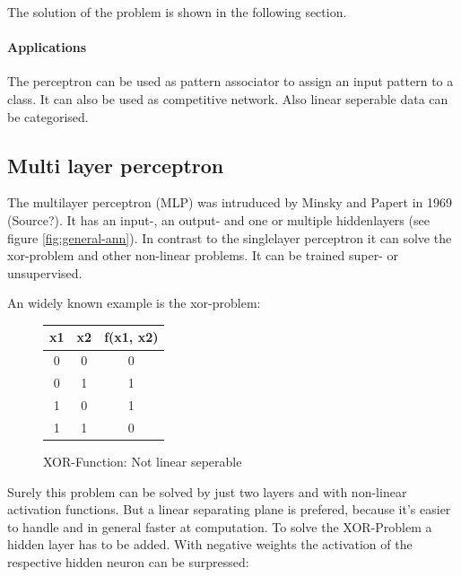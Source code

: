 \documentclass[10pt,a4paper,DIV=11]{scrreprt}
\begin{document}
The solution of the problem is shown in the following section.

\paragraph*{Applications}
The perceptron can be used as pattern associator to assign an input pattern to a class. It can also be used as competitive network. Also linear seperable data can be categorised.

\subsection{Multi layer perceptron} \label{sec:mlp}
The multilayer perceptron (MLP) was intruduced by Minsky and Papert in 1969 (Source?). It has an input-, an output- and
one or multiple hiddenlayers (see figure \ref{fig:general-ann}). In contrast to the singlelayer perceptron it can solve the xor-problem and other non-linear problems. It can be trained super- or unsupervised.

An widely known example is the xor-problem:

\begin{figure}[H]
	\centering
	\begin{tabular}{|c|c|c|}
		\hline
		x1 & x2 & f(x1, x2)\\
		\hline
		0 & 0 & 0 \\
		\hline
		0 & 1 & 1 \\
		\hline
		1 & 0 & 1 \\
		\hline
		1 & 1 & 0 \\
		\hline
	\end{tabular}
	\caption{XOR-Function: Not linear seperable}
	\label{fig:nlinsep}

\end{figure}

Surely this problem can be solved by just two layers and with non-linear activation functions. But a linear separating plane is prefered, because it's easier to handle and in general faster at computation.
To solve the XOR-Problem a hidden layer has to be added. With negative weights the activation of the respective hidden neuron can be surpressed:
\end{document}
